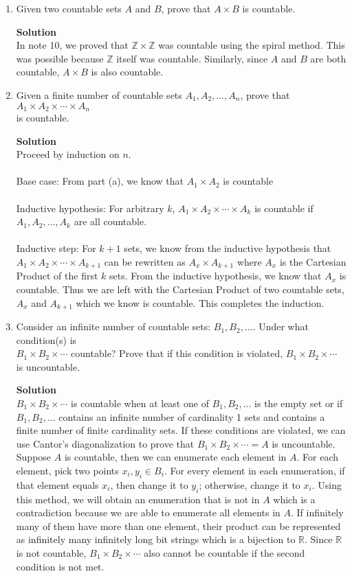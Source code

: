 \documentclass[11pt]{article}
\newenvironment{Parts}{\begin{enumerate}[label=(\alph*)]}{\end{enumerate}}
\newcommand*{\Part}{\item}
\newenvironment{Answer}{\vspace{10pt}\begin{mdframed}\textbf{Solution}\\}{\end{mdframed}\vfill\pagebreak[3]}
\newenvironment{Answer}{\vspace{10pt}}{\vfill\pagebreak[3]}
\newcommand*{\Z}{\mathbb{Z}}
\newcommand*{\R}{\mathbb{R}}
\begin{document}
\begin{Parts}
    \Part Given two countable sets $A$ and $B$, prove that $A \times B$ is countable.
    \begin{Answer}
        In note 10, we proved that $\Z \times \Z$ was countable using the spiral method. This was possible because $\Z$ itself was countable. Similarly, since $A$ and $B$ are both countable, $A \times B$ is also countable. 
    \end{Answer}

    \Part Given a finite number of countable sets $A_1, A_2, \dots, A_n$, prove that 
    $A_1 \times A_2 \times \cdots \times A_n$ \\is countable. 
    \begin{Answer}
        Proceed by induction on $n$.\\
        \\
        Base case: From part (a), we know that $A_1 \times A_2$ is countable\\
        \\
        Inductive hypothesis: For arbitrary $k$, $A_1 \times A_2 \times \cdots \times A_k$ is countable if  $A_1, A_2, \dots, A_k$ are all countable.\\
        \\
        Inductive step: For $k+1$ sets, we know from the inductive hypothesis that $A_1 \times A_2 \times \cdots \times A_{k+1}$ can be rewritten as $A_x \times A_{k+1}$ where $A_x$ is the Cartesian Product of the first $k$ sets. From the inductive hypothesis, we know that $A_x$ is countable. Thus we are left with the Cartesian Product of two countable sets, $A_x$ and $A_{k+1}$ which we know is countable. This completes the induction.
    \end{Answer}

    \Part Consider an infinite number of countable sets: $B_1, B_2, \dots$. Under what
    condition(s) is \\$B_1 \times B_2 \times \cdots$ countable? Prove that if this
    condition is violated, $B_1 \times B_2 \times \cdots$ is uncountable.
    \begin{Answer}
        $B_1 \times B_2 \times \cdots$ is countable when at least one of $B_1, B_2, \dots$ is the empty set or if $B_1, B_2, \dots$ contains an infinite number of cardinality 1 sets and contains a finite number of finite cardinality sets. If these conditions are violated, we can use Cantor's diagonalization to prove that $B_1 \times B_2 \times \cdots=A$ is uncountable. Suppose $A$ is countable, then we can enumerate each element in $A$. For each element, pick two points $x_i, y_i \in B_i$. For every element in each enumeration, if that element equals $x_i$, then change it to $y_i$; otherwise, change it to $x_i$. Using this method, we will obtain an enumeration that is not in $A$ which is a contradiction because we are able to enumerate all elements in $A$. If infinitely many of them have more than one element, their product can be represented as infinitely many infinitely long bit strings which is a bijection to $\R$. Since $\R$ is not countable, $B_1 \times B_2 \times \cdots$ also cannot be countable if the second condition is not met.
    \end{Answer}


\end{Parts}
\end{document}
